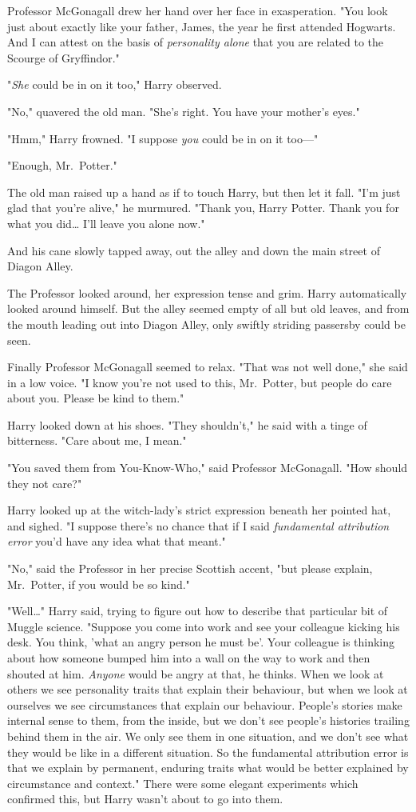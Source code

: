Professor McGonagall drew her hand over her face in exasperation. "You look just about exactly like your father, James, the year he first attended Hogwarts. And I can attest on the basis of \emph{personality alone} that you are related to the Scourge of Gryffindor."

"\emph{She} could be in on it too," Harry observed.

"No," quavered the old man. "She's right. You have your mother's eyes."

"Hmm," Harry frowned. "I suppose \emph{you} could be in on it too---"

"Enough, Mr.~Potter."

The old man raised up a hand as if to touch Harry, but then let it fall. "I'm just glad that you're alive," he murmured. "Thank you, Harry Potter. Thank you for what you did{\ldots} I'll leave you alone now."

And his cane slowly tapped away, out the alley and down the main street of Diagon Alley.

The Professor looked around, her expression tense and grim. Harry automatically looked around himself. But the alley seemed empty of all but old leaves, and from the mouth leading out into Diagon Alley, only swiftly striding passersby could be seen.

Finally Professor McGonagall seemed to relax. "That was not well done," she said in a low voice. "I know you're not used to this, Mr.~Potter, but people do care about you. Please be kind to them."

Harry looked down at his shoes. "They shouldn't," he said with a tinge of bitterness. "Care about me, I mean."

"You saved them from You-Know-Who," said Professor McGonagall. "How should they not care?"

Harry looked up at the witch-lady's strict expression beneath her pointed hat, and sighed. "I suppose there's no chance that if I said \emph{fundamental attribution error} you'd have any idea what that meant."

"No," said the Professor in her precise Scottish accent, "but please explain, Mr.~Potter, if you would be so kind."

"Well{\ldots}" Harry said, trying to figure out how to describe that particular bit of Muggle science. "Suppose you come into work and see your colleague kicking his desk. You think, 'what an angry person he must be'. Your colleague is thinking about how someone bumped him into a wall on the way to work and then shouted at him. \emph{Anyone} would be angry at that, he thinks. When we look at others we see personality traits that explain their behaviour, but when we look at ourselves we see circumstances that explain our behaviour. People's stories make internal sense to them, from the inside, but we don't see people's histories trailing behind them in the air. We only see them in one situation, and we don't see what they would be like in a different situation. So the fundamental attribution error is that we explain by permanent, enduring traits what would be better explained by circumstance and context." There were some elegant experiments which confirmed this, but Harry wasn't about to go into them.

